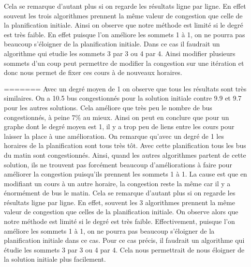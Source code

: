 \documentclass[a4paper,11pt]{article}
\begin{document}
	Cela se remarque d'autant plus si on regarde les résultats ligne par ligne. En effet souvent les trois algorithmes prennent la même valeur de congestion que celle de la planification initiale. Ainsi on observe que notre méthode est limité si le degré est très faible. En effet puisque l'on améliore les sommets 1 à 1, on ne pourra pas beaucoup s'éloigner de la planification initiale. Dans ce cas il faudrait un algorithme qui etudie les sommets 3 par 3 ou 4 par 4. Ainsi modifier plusieurs sommets d'un coup peut permettre de modifier la congestion sur une itération et donc nous permet de fixer ces cours à de nouveaux horaires.
	
=======
	Avec un degré moyen de 1 on observe que tous les résultats sont très similaires. On a 10.5 bus congestionnés pour la solution initiale contre 9.9 et 9.7 pour les autres solutions. Cela améliore que très peu le nombre de bus congestionnés, à peine 7\% au mieux. Ainsi on peut en conclure que pour un graphe dont le degré moyen est 1, il y a trop peu de liens entre les cours pour laisser la place à une amélioration. On remarque qu'avec un degré de 1 les horaires de la planification sont tous très tôt. Avec cette planification tous les bus du matin sont congestionnés. Ainsi, quand les autres algorithmes partent de cette solution, ils ne trouvent pas forcément beaucoup d'améliorations à faire pour améliorer la congestion puisqu'ils prennent les sommets 1 à 1. La cause est que en modifiant un cours à un autre horaire, la congestion reste la même car il y a énormément de bus le matin. Cela se remarque d'autant plus si on regarde les résultats ligne par ligne. En effet, souvent les 3 algorithmes prennent la même valeur de congestion que celles de la planification initiale. On observe alors que notre méthode est limité si le degré est très faible. Effectivement, puisque l'on améliore les sommets 1 à 1, on ne pourra pas beaucoup s'éloigner de la planification initiale dans ce cas. Pour ce cas précis, il faudrait un algorithme qui étudie les sommets 3 par 3 ou 4 par 4. Cela nous permettrait de nous éloigner de la solution initiale plus facilement.
\end{document}
